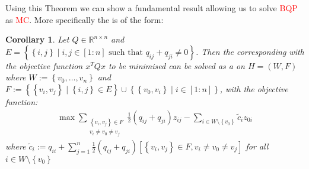 \documentclass[12pt,a4paper]{article}
\theoremstyle{mythm}
\newtheorem{cor}[thm]{Corollary}
\begin{document}
Using this Theorem we can show a fundamental result allowing us to solve \textcolor{red}{BQP} as \textcolor{red}{MC}. 
More specifically the \BQP is of the form:
\begin{cor}
Let $ Q \in \mathbb{R} ^{ n \times n }  $ and $ E = \left\{ \left\{ i,j \right\}  \mid i,j \in \left[ 1:n \right] \text{ such that } q _{ ij } + q _{ ji } \neq 0  \right\}  $.
Then the corresponding \BQP with the objective function $ x ^T Q x $ to be minimised can be solved as a \MCP on $ H = \left( W,F \right)  $ where $ W := \left\{ v_0,
\dots, v_n \right\}  $ and $ F := \left\{ \left\{ v_i,v_j \right\}  \mid \left\{ i,j \right\} \in E \right\} \cup \left\{ \left\{ v_0,v_i \right\}  \mid i \in \left[ 1:n
\right]   \right\}  $, with the objective function:
\begin{align*}
\max \sum_{  \substack{ \left\{ v_i,v_j \right\} \in F \\ v_i \neq v_0 \neq v_j	 }  }^{  } \frac{ 1 }{ 2 } \left( q _{ ij } + q _{ ji }  \right) z _{ ij } - \sum_{ i \in W
\setminus \left\{  v_0  \right\} }^{  } \widetilde{ c } _{ i } z _{ 0i } 
\end{align*} 
where $ \widetilde{ c }_i := q _{ ii } + \sum_{ j=1  }^{ n } \frac{ 1 }{ 2 } \left( q _{ ij } + q _{ ji }  \right) \left[ \left\{ v_i , v_j \right\} \in F, v_i \neq v_0 \neq v_j
\right]  $ for all $ i \in W \setminus \left\{ v_0 \right\}  $ 
\end{cor} 
\end{document}
